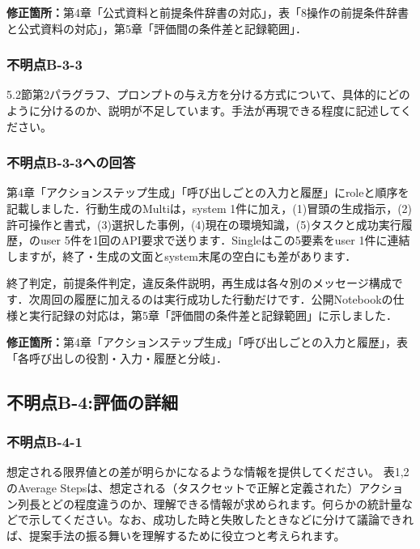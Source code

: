 \documentclass{jsarticle}
\begin{document}
\noindent\textbf{修正箇所：}第4章「公式資料と前提条件辞書の対応」，表「8操作の前提条件辞書と公式資料の対応」，第5章「評価間の条件差と記録範囲」．



\subsubsection*{不明点B-3-3}
\begin{screen}
5.2節第2パラグラフ、プロンプトの与え方を分ける方式について、具体的にどのように分けるのか、説明が不足しています。手法が再現できる程度に記述してください。
\end{screen}

\subsubsection*{不明点B-3-3への回答}
第4章「アクションステップ生成」「呼び出しごとの入力と履歴」にroleと順序を記載しました．行動生成のMultiは，system 1件に加え，(1)冒頭の生成指示，(2)許可操作と書式，(3)選択した事例，(4)現在の環境知識，(5)タスクと成功実行履歴，のuser 5件を1回のAPI要求で送ります．Singleはこの5要素をuser 1件に連結しますが，終了・生成の文面とsystem末尾の空白にも差があります．

終了判定，前提条件判定，違反条件説明，再生成は各々別のメッセージ構成です．次周回の履歴に加えるのは実行成功した行動だけです．公開Notebookの仕様と実行記録の対応は，第5章「評価間の条件差と記録範囲」に示しました．

\noindent\textbf{修正箇所：}第4章「アクションステップ生成」「呼び出しごとの入力と履歴」，表「各呼び出しの役割・入力・履歴と分岐」．



\subsection*{不明点B-4:評価の詳細}

\subsubsection*{不明点B-4-1}
\begin{screen}
想定される限界値との差が明らかになるような情報を提供してください。
表1,2のAverage Stepsは、想定される（タスクセットで正解と定義された）アクション列長とどの程度違うのか、理解できる情報が求められます。何らかの統計量などで示してください。なお、成功した時と失敗したときなどに分けて議論できれば、提案手法の振る舞いを理解するために役立つと考えられます。
\end{screen}
\end{document}
